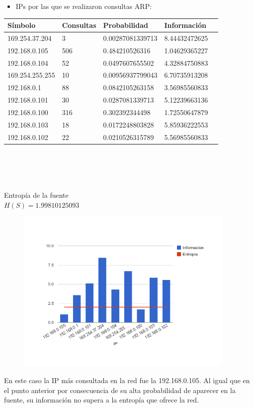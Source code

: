 \begin{itemize}
 \item IPs por las que se realizaron consultas ARP:\\
\end{itemize}

\begin{tabular}{|l|l|l|l|l|}
  \hline
  S\'imbolo & Consultas & Probabilidad & Informaci\'on \\
  \hline
  169.254.37.204 & 3 & 0.00287081339713 & 8.44432472625\\
  \hline
  192.168.0.105 & 506 & 0.484210526316 & 1.04629365227\\
  \hline
  192.168.0.104 & 52 & 0.0497607655502 & 4.32884750883\\
  \hline
  169.254.255.255 & 10 & 0.00956937799043 & 6.70735913208\\
  \hline
  192.168.0.1 & 88 & 0.0842105263158 & 3.56985560833\\
  \hline
  192.168.0.101 & 30 & 0.0287081339713 & 5.12239663136\\
  \hline
  192.168.0.100 & 316 & 0.302392344498 & 1.72550647879\\
  \hline
  192.168.0.103 & 18 & 0.0172248803828 & 5.85936222553\\
  \hline
  192.168.0.102 & 22 & 0.0210526315789 & 5.56985560833\\
  \hline
\end{tabular}\\
\\ \ \\ \ \\ 
Entrop\'ia de la fuente\\
$H(S) = 1.99810125093$\\

\begin{figure}[h]
  \centering                                                       
          \includegraphics[width=300pt]{consultadas1.png}
\end{figure}

En este caso la IP m\'as consultada en la red fue la 192.168.0.105. Al igual que en el punto anterior por consecuencia de su alta probabilidad de aparecer en la fuente, su informaci\'on no supera a la entrop\'ia que ofrece la red.


